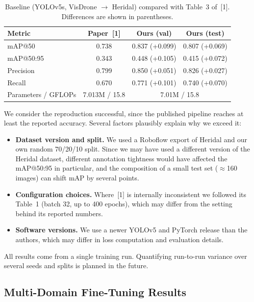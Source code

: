 \documentclass{article}
\begin{document}
\begin{table}[h]
  \caption{Baseline (YOLOv5s, VisDrone $\rightarrow$ Heridal) compared with Table~3 of~[1]. Differences are shown in parentheses.}
  \label{tab:baseline}
  \centering
  \small
  \begin{tabular}{lccc}
    \toprule
    Metric & Paper~[1] & Ours (val) & Ours (test) \\
    \midrule
    mAP@50 & 0.738 & 0.837 (+0.099) & 0.807 (+0.069) \\
    mAP@50:95 & 0.343 & 0.448 (+0.105) & 0.415 (+0.072) \\
    Precision & 0.799 & 0.850 (+0.051) & 0.826 (+0.027) \\
    Recall & 0.670 & 0.771 (+0.101) & 0.740 (+0.070) \\
    \midrule
    Parameters / GFLOPs & 7.013M / 15.8 & \multicolumn{2}{c}{7.01M / 15.8} \\
    \bottomrule
  \end{tabular}
\end{table}
 
We consider the reproduction successful, since the published pipeline reaches at least the reported accuracy. Several factors plausibly explain why we exceed it:
\begin{itemize}
    \item \textbf{Dataset version and split.} We used a Roboflow export of Heridal and our own random 70/20/10 split. Since we may have used a different version of the Heridal dataset, different annotation tightness  would have affected the mAP@50:95 in particular, and the composition of a small test set ($\approx$160 images) can shift mAP by several points.
    \item \textbf{Configuration choices.} Where~[1] is internally inconsistent we followed its Table~1 (batch 32, up to 400 epochs), which may differ from the setting behind its reported numbers.
    \item \textbf{Software versions.} We use a newer YOLOv5 and PyTorch release than the authors, which may differ in loss computation and evaluation details.
\end{itemize}
All results come from a single training run. Quantifying run-to-run variance over several seeds and splits is planned in the future.

\subsection{Multi-Domain Fine-Tuning Results}
\end{document}
